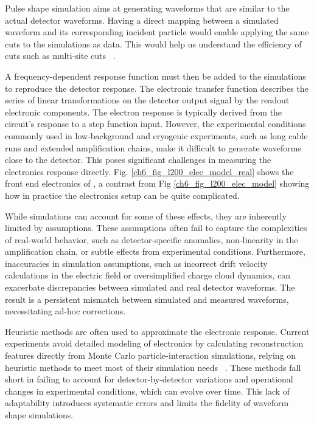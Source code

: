 Pulse shape simulation aims at generating waveforms that are similar to the actual detector waveforms. Having a direct mapping between a simulated waveform and its corresponding incident particle would enable applying the same cuts to the simulations as data. This would help us understand the efficiency of cuts such as multi-site cuts ~\cite{AvsE}.  


A frequency-dependent response function must then be added to the simulations to reproduce the detector response. The electronic transfer function describes the series of linear transformations on the detector output signal by the readout electronic components. The electron response is typically derived from the circuit's response to a step function input. However, the experimental conditions commonly used in low-background and cryogenic experiments, such as long cable runs and extended amplification chains, make it difficult to generate waveforms close to the detector. This poses significant challenges in measuring the electronics response directly. Fig. \ref{ch6_fig_l200_elec_model_real} shows the front end electronics of {\Ltwo}, a contrast from Fig \ref{ch6_fig_l200_elec_model} showing how in practice the electronics setup can be quite complicated.

While simulations can account for some of these effects, they are inherently limited by assumptions. These assumptions often fail to capture the complexities of real-world behavior, such as detector-specific anomalies, non-linearity in the amplification chain, or subtle effects from experimental conditions. Furthermore, inaccuracies in simulation assumptions, such as incorrect drift velocity calculations in the electric field or oversimplified charge cloud dynamics, can exacerbate discrepancies between simulated and real detector waveforms. The result is a persistent mismatch between simulated and measured waveforms, necessitating ad-hoc corrections. 

Heuristic methods are often used to approximate the electronic response. Current experiments avoid detailed modeling of electronics by calculating reconstruction features directly from Monte Carlo particle-interaction simulations, relying on heuristic methods to meet most of their simulation needs ~\cite{Ben_Thesis,Sam_Thesis}. These methods fall short in failing to account for detector-by-detector variations and operational changes in experimental conditions, which can evolve over time. This lack of adaptability introduces systematic errors and limits the fidelity of waveform shape simulations.


